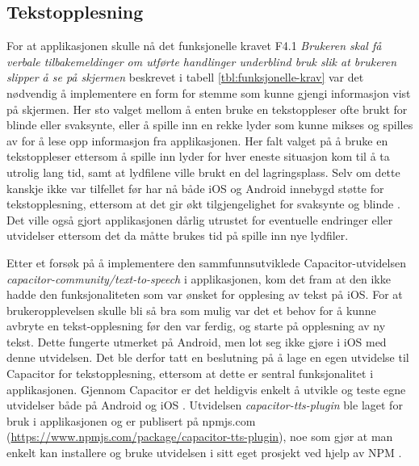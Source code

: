 \subsection{Tekstopplesning}
For at applikasjonen skulle nå det funksjonelle kravet F4.1 \textit{Brukeren skal få verbale tilbakemeldinger om utførte handlinger underblind bruk slik at brukeren slipper å se på skjermen} beskrevet i tabell \ref{tbl:funksjonelle-krav} var det nødvendig å implementere en form for stemme som kunne gjengi informasjon vist på skjermen. Her sto valget mellom å enten bruke en tekstoppleser ofte brukt for blinde eller svaksynte, eller å spille inn en rekke lyder som kunne mikses og spilles av for å lese opp informasjon fra applikasjonen. Her falt valget på å bruke en tekstoppleser ettersom å spille inn lyder for hver eneste situasjon kom til å ta utrolig lang tid, samt at lydfilene ville brukt en del lagringsplass. Selv om dette kanskje ikke var tilfellet før har nå både iOS og Android innebygd støtte for tekstopplesning, ettersom at det gir økt tilgjengelighet for svaksynte og blinde \cite{TextToSpeechAndroidDevelopers, AVSpeechSynthesizerAppleDeveloper}. Det ville også gjort applikasjonen dårlig utrustet for eventuelle endringer eller utvidelser ettersom det da måtte brukes tid på spille inn nye lydfiler.
\newline

\noindent
Etter et forsøk på å implementere den sammfunnsutviklede Capacitor-utvidelsen \textit{capacitor-community/text-to-speech} \cite{CapacitorcommunityTexttospeech2021} i applikasjonen, kom det fram at den ikke hadde den funksjonaliteten som var ønsket for opplesing av tekst på iOS. For at brukeropplevelsen skulle bli så bra som mulig var det et behov for å kunne avbryte en tekst-opplesning før den var ferdig, og starte på opplesning av ny tekst. Dette fungerte utmerket på Android, men lot seg ikke gjøre i iOS med denne utvidelsen. Det ble derfor tatt en beslutning på å lage en egen utvidelse til Capacitor for tekstopplesning, ettersom at dette er sentral funksjonalitet i applikasjonen. Gjennom Capacitor er det heldigvis enkelt å utvikle og teste egne utvidelser både på Android og iOS \cite{CreatingCapacitorPlugins}. Utvidelsen \textit{capacitor-tts-plugin} ble laget for bruk i applikasjonen og er publisert på npmjs.com (\url{https://www.npmjs.com/package/capacitor-tts-plugin}), noe som gjør at man enkelt kan installere og bruke utvidelsen i sitt eget prosjekt ved hjelp av NPM \cite{NpmNpmDocs}. 


